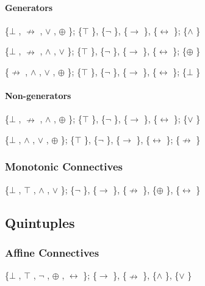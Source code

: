\hypertarget{generators-4}{%
\paragraph{Generators}\label{generators-4}}

\{$\bot$ , $\nrightarrow$ , $\lor$ , $\oplus$ \}; \{$\top$ \}, \{$\neg$ \}, \{$\to$ \}, \{$\leftrightarrow$ \}; \{$\land$ \}

\{$\bot$ , $\nrightarrow$ , $\land$ , $\lor$ \}; \{$\top$ \}, \{$\neg$ \}, \{$\to$ \}, \{$\leftrightarrow$ \}; \{$\oplus$ \}

\{$\nrightarrow$ , $\land$ , $\lor$ , $\oplus$ \}; \{$\top$ \}, \{$\neg$ \}, \{$\to$ \}, \{$\leftrightarrow$ \}; \{$\bot$ \}

\hypertarget{non-generators-4}{%
\paragraph{Non-generators}\label{non-generators-4}}

\{$\bot$ , $\nrightarrow$ , $\land$ , $\oplus$ \}; \{$\top$ \}, \{$\neg$ \}, \{$\to$ \}, \{$\leftrightarrow$ \}; \{$\lor$ \}

\{$\bot$ , $\land$ , $\lor$ , $\oplus$ \}; \{$\top$ \}, \{$\neg$ \}, \{$\to$ \}, \{$\leftrightarrow$ \}; \{$\nrightarrow$ \}

\hypertarget{monotonic-connectives}{%
\subsubsection{\texorpdfstring{Monotonic Connectives
}{Monotonic Connectives }}\label{monotonic-connectives}}

\{$\bot$ , $\top$ , $\land$ , $\lor$ \}; \{$\neg$ \}, \{$\to$ \}, \{$\nrightarrow$ \}, \{$\oplus$ \}, \{$\leftrightarrow$ \}

\hypertarget{quintuples}{%
\subsection{Quintuples}\label{quintuples}}

\hypertarget{affine-connectives-2}{%
\subsubsection{Affine Connectives}\label{affine-connectives-2}}

\{$\bot$ , $\top$ , $\neg$ , $\oplus$ , $\leftrightarrow$ \}; \{$\to$ \}, \{$\nrightarrow$ \}, \{$\land$ \}, \{$\lor$ \}

